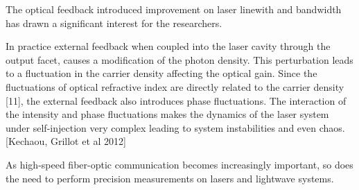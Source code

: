 
\Abstract

The optical feedback introduced improvement on laser linewith and bandwidth has drawn a significant interest for the researchers.

In practice external feedback when coupled into the laser cavity through the output facet, causes a modification of the photon density. This perturbation leads to a fluctuation in the carrier density affecting the optical gain. Since the fluctuations of optical refractive index are directly related to the carrier density [11], the external feedback also introduces phase fluctuations. The interaction of the intensity and phase fluctuations makes the dynamics of the laser system under self-injection very complex leading to system instabilities and even chaos. [Kechaou, Grillot et al 2012]

As high-speed fiber-optic communication becomes increasingly important, so does the need to perform precision measurements on lasers and lightwave systems.
